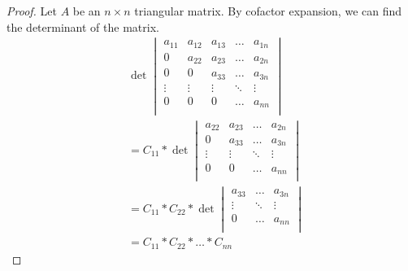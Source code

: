 \begin{proof}
    Let $A$ be an $n\times n$ triangular matrix. By cofactor expansion, we can
    find the determinant of the matrix. 
    \begin{align*}
        &\det
        \begin{vmatrix}
            a_{11} & a_{12} & a_{13} & \ldots & a_{1n} \\
            0 & a_{22} & a_{23} & \ldots & a_{2n}  \\
            0 & 0 & a_{33} & \ldots & a_{3n}  \\
            \vdots & \vdots & \vdots & \ddots & \vdots \\
            0 & 0 & 0 & \ldots & a_{nn} \\
        \end{vmatrix}\\
        &= C_{11}*\det
        \begin{vmatrix}
            a_{22} & a_{23} & \ldots & a_{2n}  \\
            0 & a_{33} & \ldots & a_{3n}  \\
            \vdots & \vdots & \ddots & \vdots \\
            0 & 0 & \ldots & a_{nn} \\
        \end{vmatrix}\\
        &= C_{11}*C_{22}*\det
        \begin{vmatrix}
            a_{33} & \ldots & a_{3n}  \\
            \vdots & \ddots & \vdots \\
            0 & \ldots & a_{nn} \\
        \end{vmatrix}\\
        &= C_{11}*C_{22}*\ldots*C_{nn}
    \end{align*}
\end{proof}

